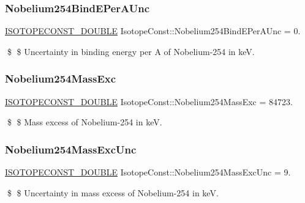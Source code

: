 \subsubsection{\texorpdfstring{Nobelium254\+Bind\+E\+Per\+A\+Unc}{Nobelium254BindEPerAUnc}}
{\footnotesize\ttfamily \mbox{\hyperlink{group___isotope_const-_macros_ga8f45a7272ce02c0b4c65c44636ed719a}{I\+S\+O\+T\+O\+P\+E\+C\+O\+N\+S\+T\+\_\+\+D\+O\+U\+B\+LE}} Isotope\+Const\+::\+Nobelium254\+Bind\+E\+Per\+A\+Unc = 0.}

\$ \$ Uncertainty in binding energy per A of Nobelium-\/254 in keV. \mbox{\label{group___isotope_const-_nobelium-_no254_ga40907bd516ba0c7c80937ff8d4d10523}} 
\subsubsection{\texorpdfstring{Nobelium254\+Mass\+Exc}{Nobelium254MassExc}}
{\footnotesize\ttfamily \mbox{\hyperlink{group___isotope_const-_macros_ga8f45a7272ce02c0b4c65c44636ed719a}{I\+S\+O\+T\+O\+P\+E\+C\+O\+N\+S\+T\+\_\+\+D\+O\+U\+B\+LE}} Isotope\+Const\+::\+Nobelium254\+Mass\+Exc = 84723.}

\$ \$ Mass excess of Nobelium-\/254 in keV. \mbox{\label{group___isotope_const-_nobelium-_no254_gab14f076947eb04963acc9ac62e0dfdad}} 
\subsubsection{\texorpdfstring{Nobelium254\+Mass\+Exc\+Unc}{Nobelium254MassExcUnc}}
{\footnotesize\ttfamily \mbox{\hyperlink{group___isotope_const-_macros_ga8f45a7272ce02c0b4c65c44636ed719a}{I\+S\+O\+T\+O\+P\+E\+C\+O\+N\+S\+T\+\_\+\+D\+O\+U\+B\+LE}} Isotope\+Const\+::\+Nobelium254\+Mass\+Exc\+Unc = 9.}

\$ \$ Uncertainty in mass excess of Nobelium-\/254 in keV. \mbox{\label{group___isotope_const-_nobelium-_no254_ga15649c58d70903d1f985badaafc169e2}} 
